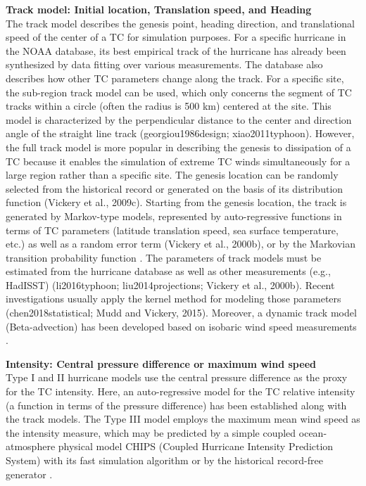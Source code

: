 \noindent\textbf{Track model: Initial location, Translation speed, and Heading} \\The track model describes the genesis point, heading direction, and translational speed of the center of a TC for simulation purposes. For a specific hurricane in the NOAA database, its best empirical track of the hurricane has already been synthesized by data fitting over various measurements. The database also describes how other TC parameters change along the track. For a specific site, the sub-region track model can be used, which only concerns the segment of TC tracks within a circle (often the radius is 500 km) centered at the site. This model is characterized by the perpendicular distance to the center and direction angle of the straight line track (georgiou1986design; xiao2011typhoon). However, the full track model is more popular in describing the genesis to dissipation of a TC because it enables the simulation of extreme TC winds simultaneously for a large region rather than a specific site. The genesis location can be randomly selected from the historical record or generated on the basis of its distribution function (Vickery et al., 2009c). Starting from the genesis location, the track is generated by Markov-type models, represented by auto-regressive functions in terms of TC parameters (latitude translation speed, sea surface temperature, etc.) as well as a random error term (Vickery et al., 2000b), or by the Markovian transition probability function \citep{emanuel2006statistical}. The parameters of track models must be estimated from the hurricane database as well as other measurements (e.g., HadISST) (li2016typhoon; liu2014projections; Vickery et al., 2000b). Recent investigations usually apply the kernel method for modeling those parameters (chen2018statistical; Mudd and Vickery, 2015). Moreover, a dynamic track model (Beta-advection) has been developed based on isobaric wind speed measurements \citep{emanuel2006statistical}. 
\newline

\noindent\textbf{Intensity: Central pressure difference or maximum wind speed} \\Type I and II hurricane models use the central pressure difference as the proxy for the TC intensity. Here, an auto-regressive model for the TC relative intensity (a function in terms of the pressure difference) has been established along with the track models. The Type III model employs the maximum mean wind speed as the intensity measure, which may be predicted by a simple coupled ocean-atmosphere physical model CHIPS (Coupled Hurricane Intensity Prediction System) with its fast simulation algorithm \citep{emanuel2011selfstratification,emanuel2017fast,emanuel2004environmental} or by the historical record-free generator \citep{emanuel2008hurricanes}. 
\newline

